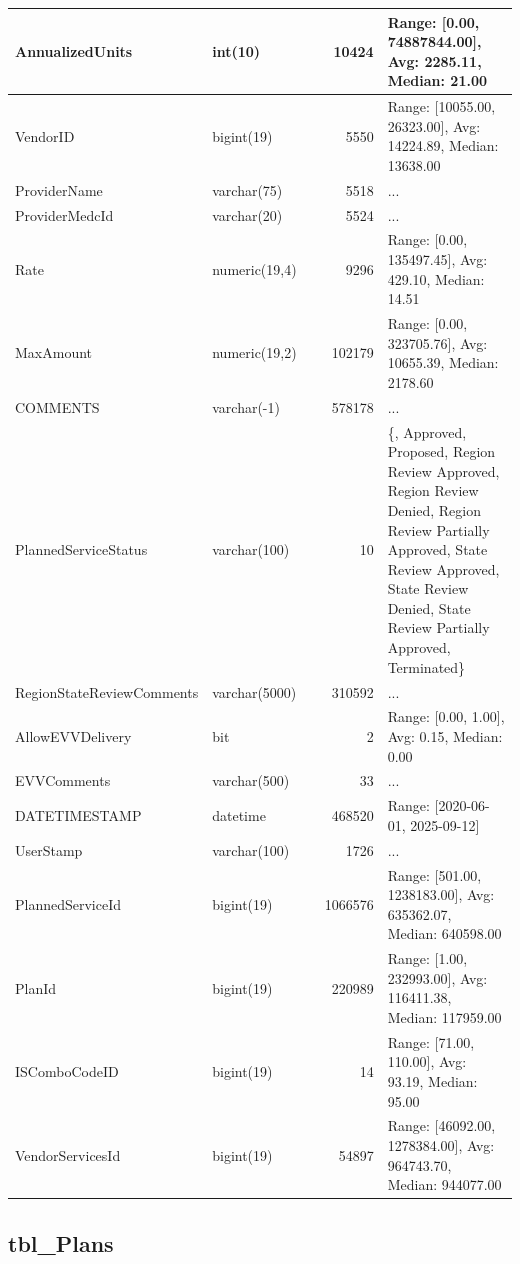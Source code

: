 \begin{landscape}
\begin{longtable}{|l|l|l|r|p{6cm}|}
\hline
AnnualizedUnits & int(10) &  & 10424 & Range: [0.00, 74887844.00], Avg: 2285.11, Median: 21.00 \\
\hline
VendorID & bigint(19) &  & 5550 & Range: [10055.00, 26323.00], Avg: 14224.89, Median: 13638.00 \\
\hline
ProviderName & varchar(75) &  & 5518 & ... \\
\hline
ProviderMedcId & varchar(20) &  & 5524 & ... \\
\hline
Rate & numeric(19,4) &  & 9296 & Range: [0.00, 135497.45], Avg: 429.10, Median: 14.51 \\
\hline
MaxAmount & numeric(19,2) &  & 102179 & Range: [0.00, 323705.76], Avg: 10655.39, Median: 2178.60 \\
\hline
COMMENTS & varchar(-1) &  & 578178 & ... \\
\hline
PlannedServiceStatus & varchar(100) &  & 10 & \{, Approved, Proposed, Region Review Approved, Region Review Denied, Region Review Partially Approved, State Review Approved, State Review Denied, State Review Partially Approved, Terminated\} \\
\hline
RegionStateReviewComments & varchar(5000) &  & 310592 & ... \\
\hline
AllowEVVDelivery & bit &  & 2 & Range: [0.00, 1.00], Avg: 0.15, Median: 0.00 \\
\hline
EVVComments & varchar(500) &  & 33 & ... \\
\hline
DATETIMESTAMP & datetime &  & 468520 & Range: [2020-06-01, 2025-09-12] \\
\hline
UserStamp & varchar(100) &  & 1726 & ... \\
\hline
PlannedServiceId & bigint(19) &  & 1066576 & Range: [501.00, 1238183.00], Avg: 635362.07, Median: 640598.00 \\
\hline
PlanId & bigint(19) &  & 220989 & Range: [1.00, 232993.00], Avg: 116411.38, Median: 117959.00 \\
\hline
ISComboCodeID & bigint(19) &  & 14 & Range: [71.00, 110.00], Avg: 93.19, Median: 95.00 \\
\hline
VendorServicesId & bigint(19) &  & 54897 & Range: [46092.00, 1278384.00], Avg: 964743.70, Median: 944077.00 \\
\hline
\end{longtable}

\subsection{tbl\_Plans}


\end{landscape}
